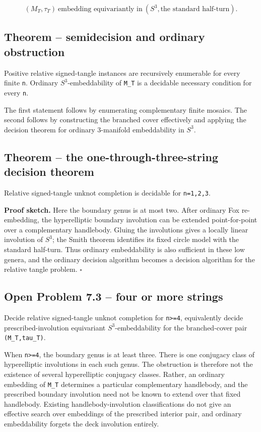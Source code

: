 \documentclass[11pt]{article}
\begin{document}
\[
 (M_T,\tau_T)\ \text{embedding equivariantly in}\
 (S^3,\text{the standard half-turn}).
\]

\subsection{Theorem -- semidecision and ordinary obstruction}

Positive relative signed-tangle instances are recursively enumerable for
every finite \texttt{n}.  Ordinary $S^3$-embeddability of \texttt{M\_T} is a decidable
necessary condition for every \texttt{n}.

The first statement follows by enumerating complementary finite mosaics.  The
second follows by constructing the branched cover effectively and applying
the decision theorem for ordinary 3-manifold embeddability in $S^3$.

\subsection{Theorem -- the one-through-three-string decision theorem}

Relative signed-tangle unknot completion is decidable for \texttt{n=1,2,3}.

\textbf{Proof sketch.}  Here the boundary genus is at most two.  After ordinary Fox
re-embedding, the hyperelliptic boundary involution can be extended
point-for-point over a complementary handlebody.  Gluing the involutions gives
a locally linear involution of $S^3$; the Smith theorem identifies its fixed
circle model with the standard half-turn.  Thus ordinary embeddability is also
sufficient in these low genera, and the ordinary decision algorithm becomes a
decision algorithm for the relative tangle problem. \hfill$\square$

\subsection{Open Problem 7.3 -- four or more strings}

Decide relative signed-tangle unknot completion for \texttt{n>=4}, equivalently decide
prescribed-involution equivariant $S^3$-embeddability for the branched-cover
pair \texttt{(M\_T,tau\_T)}.

When \texttt{n>=4}, the boundary genus is at least three.  There is one conjugacy
class of hyperelliptic involutions in each such genus.  The obstruction is
therefore not the existence of several hyperelliptic conjugacy classes.
Rather, an ordinary embedding of \texttt{M\_T} determines a particular complementary
handlebody, and the prescribed boundary involution need not be known to extend
over that fixed handlebody.  Existing handlebody-involution classifications
do not give an effective search over embeddings of the prescribed interior
pair, and ordinary embeddability forgets the deck involution entirely.
\end{document}
